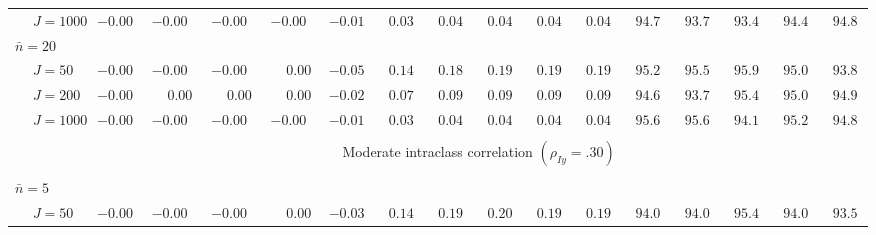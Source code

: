 \begin{sidewaystable}
\begin{threeparttable}
\begin{tabular}{llccccccccccccccc}
 & \nopagebreak $\;J=1000$  & ${-}0.00\phantom{0}$ & ${-}0.00\phantom{0}$ & ${-}0.00\phantom{0}$ & ${-}0.00\phantom{0}$ & ${-}0.01\phantom{0}$ & $\phantom{0}0.03\phantom{0}$ & $\phantom{0}0.04\phantom{0}$ & $\phantom{0}0.04\phantom{0}$ & $\phantom{0}0.04\phantom{0}$ & $\phantom{0}0.04\phantom{0}$ & $\phantom{0}94.7\phantom{0}$ & $\phantom{0}93.7\phantom{0}$ & $\phantom{0}93.4\phantom{0}$ & $\phantom{0}94.4\phantom{0}$ & $\phantom{0}94.8\phantom{0}$ \\
\multicolumn{4}{l}{$\bar{n}=20$} \\  & \nopagebreak $\;J=50$  & ${-}0.00\phantom{0}$ & ${-}0.00\phantom{0}$ & ${-}0.00\phantom{0}$ & $\phantom{-}0.00\phantom{0}$ & ${-}0.05\phantom{0}$ & $\phantom{0}0.14\phantom{0}$ & $\phantom{0}0.18\phantom{0}$ & $\phantom{0}0.19\phantom{0}$ & $\phantom{0}0.19\phantom{0}$ & $\phantom{0}0.19\phantom{0}$ & $\phantom{0}95.2\phantom{0}$ & $\phantom{0}95.5\phantom{0}$ & $\phantom{0}95.9\phantom{0}$ & $\phantom{0}95.0\phantom{0}$ & $\phantom{0}93.8\phantom{0}$ \\
 & \nopagebreak $\;J=200$  & ${-}0.00\phantom{0}$ & $\phantom{-}0.00\phantom{0}$ & $\phantom{-}0.00\phantom{0}$ & $\phantom{-}0.00\phantom{0}$ & ${-}0.02\phantom{0}$ & $\phantom{0}0.07\phantom{0}$ & $\phantom{0}0.09\phantom{0}$ & $\phantom{0}0.09\phantom{0}$ & $\phantom{0}0.09\phantom{0}$ & $\phantom{0}0.09\phantom{0}$ & $\phantom{0}94.6\phantom{0}$ & $\phantom{0}93.7\phantom{0}$ & $\phantom{0}95.4\phantom{0}$ & $\phantom{0}95.0\phantom{0}$ & $\phantom{0}94.9\phantom{0}$ \\
 & \nopagebreak $\;J=1000$  & ${-}0.00\phantom{0}$ & ${-}0.00\phantom{0}$ & ${-}0.00\phantom{0}$ & ${-}0.00\phantom{0}$ & ${-}0.01\phantom{0}$ & $\phantom{0}0.03\phantom{0}$ & $\phantom{0}0.04\phantom{0}$ & $\phantom{0}0.04\phantom{0}$ & $\phantom{0}0.04\phantom{0}$ & $\phantom{0}0.04\phantom{0}$ & $\phantom{0}95.6\phantom{0}$ & $\phantom{0}95.6\phantom{0}$ & $\phantom{0}94.1\phantom{0}$ & $\phantom{0}95.2\phantom{0}$ & $\phantom{0}94.8\phantom{0}$ \\
[0.5ex]\hline\\[-1.6ex] 
& & \multicolumn{15}{c}{Moderate intraclass correlation $(\rho_{Iy}=.30)$} \\[0.6ex]\hline\\[-1.8ex]
\multicolumn{4}{l}{$\bar{n}=5$} \\  & \nopagebreak $\;J=50$  & ${-}0.00\phantom{0}$ & ${-}0.00\phantom{0}$ & ${-}0.00\phantom{0}$ & $\phantom{-}0.00\phantom{0}$ & ${-}0.03\phantom{0}$ & $\phantom{0}0.14\phantom{0}$ & $\phantom{0}0.19\phantom{0}$ & $\phantom{0}0.20\phantom{0}$ & $\phantom{0}0.19\phantom{0}$ & $\phantom{0}0.19\phantom{0}$ & $\phantom{0}94.0\phantom{0}$ & $\phantom{0}94.0\phantom{0}$ & $\phantom{0}95.4\phantom{0}$ & $\phantom{0}94.0\phantom{0}$ & $\phantom{0}93.5\phantom{0}$ \\

\end{tabular}
\end{threeparttable}
\end{sidewaystable}
